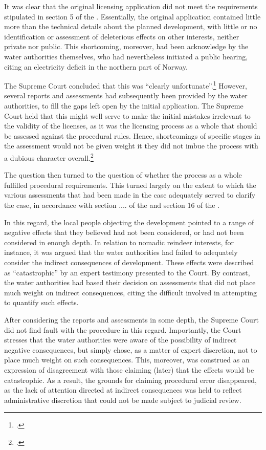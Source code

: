 It was clear that the original licensing application did not meet the requirements stipulated in section 5 of the \cite{wra17}. Essentially, the original application contained little more than the technical details about the planned development, with little or no identification or assessment of deleterious effects on other interests, neither private nor public. This shortcoming, moreover, had been acknowledge by the water authorities themselves, who had nevertheless initiated a public hearing, citing an electricity deficit in the northern part of Norway. 

The Supreme Court concluded that this was ``clearly unfortunate''.\footcite[265]{alta82} However, several reports and assessments had subsequently been provided by the water authorities, to fill the gaps left open by the initial application. The Supreme Court held that this might well serve to make the initial mistakes irrelevant to the validity of the licenses, as it was the licensing process as a whole that should be assessed against the procedural rules. Hence, shortcomings of specific stages in the assessment would not be given weight it they did not imbue the process with a dubious character overall.\footcite[265]{alta82}

The question then turned to the question of whether the process as a whole fulfilled procedural requirements. This turned largely on 
the extent to which the various assessments that had been made in the case adequately served to clarify the case, in accordance with section .... of the \cite{wra17} and section 16 of the \cite{paa67}. 

In this regard, the local people objecting the development pointed to a range of negative effects that they believed had not been considered, or had not been considered in enough depth. In relation to nomadic reindeer interests, for instance, it was argued that the water authorities had failed to adequately consider the indirect consequences of development. These effects were described as ``catastrophic'' by an expert testimony presented to the Court. By contrast, the water authorities had based their decision on assessments that did not place much weight on indirect consequences, citing the difficult involved in attempting to quantify such effects. 

After considering the reports and assessments in some depth, the Supreme Court did not find fault with the procedure in this regard. Importantly, the Court stresses that the water authorities were aware of the possibility of indirect negative consequences, but simply chose, as a matter of expert discretion, not to place much weight on such consequences. This, moreover, was construed as an expression of disagreement with those claiming (later) that the effects would be catastrophic. As a result, the grounds for claiming procedural error disappeared, as the lack of attention directed at indirect consequences was held to reflect administrative discretion that could not be made subject to judicial review.

